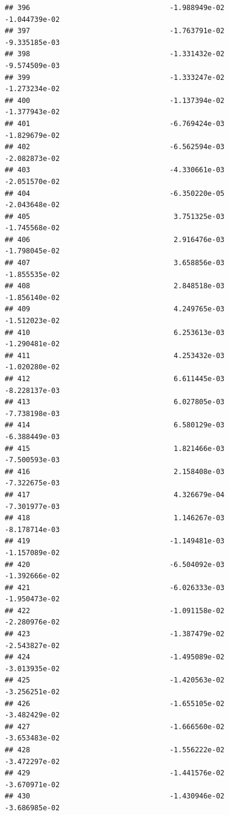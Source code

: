 \documentclass[
]{article}
\begin{document}
\begin{verbatim}
## 396                                 -1.988949e-02          -1.044739e-02
## 397                                 -1.763791e-02          -9.335185e-03
## 398                                 -1.331432e-02          -9.574509e-03
## 399                                 -1.333247e-02          -1.273234e-02
## 400                                 -1.137394e-02          -1.377943e-02
## 401                                 -6.769424e-03          -1.829679e-02
## 402                                 -6.562594e-03          -2.082873e-02
## 403                                 -4.330661e-03          -2.051570e-02
## 404                                 -6.350220e-05          -2.043648e-02
## 405                                  3.751325e-03          -1.745568e-02
## 406                                  2.916476e-03          -1.798045e-02
## 407                                  3.658856e-03          -1.855535e-02
## 408                                  2.848518e-03          -1.856140e-02
## 409                                  4.249765e-03          -1.512023e-02
## 410                                  6.253613e-03          -1.290481e-02
## 411                                  4.253432e-03          -1.020280e-02
## 412                                  6.611445e-03          -8.228137e-03
## 413                                  6.027805e-03          -7.738198e-03
## 414                                  6.580129e-03          -6.388449e-03
## 415                                  1.821466e-03          -7.500593e-03
## 416                                  2.158408e-03          -7.322675e-03
## 417                                  4.326679e-04          -7.301977e-03
## 418                                  1.146267e-03          -8.178714e-03
## 419                                 -1.149481e-03          -1.157089e-02
## 420                                 -6.504092e-03          -1.392666e-02
## 421                                 -6.026333e-03          -1.950473e-02
## 422                                 -1.091158e-02          -2.280976e-02
## 423                                 -1.387479e-02          -2.543827e-02
## 424                                 -1.495089e-02          -3.013935e-02
## 425                                 -1.420563e-02          -3.256251e-02
## 426                                 -1.655105e-02          -3.482429e-02
## 427                                 -1.666560e-02          -3.653483e-02
## 428                                 -1.556222e-02          -3.472297e-02
## 429                                 -1.441576e-02          -3.670971e-02
## 430                                 -1.430946e-02          -3.686985e-02

\end{verbatim}
\end{document}
